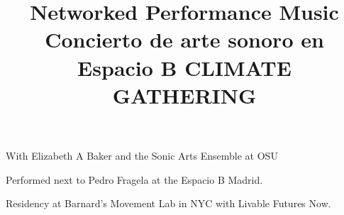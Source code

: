  \title{ Networked Performance Music }
 \begin{position}
{ With Elizabeth A Baker and the Sonic Arts Ensemble at OSU }
\end{position}

 

 \title{ Concierto de arte sonoro en Espacio B}
 \begin{position}
{ Performed next to Pedro Fragela at the Espacio B Madrid. }
\end{position}
 

 \title{ CLIMATE GATHERING}
 \begin{position}
 { 
 Residency at Barnard's Movement Lab in NYC with Livable Futures Now.
 }
\end{position}



